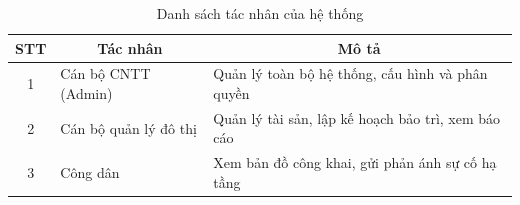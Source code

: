 \begin{table}[htbp]
    \centering
    \caption{Danh sách tác nhân của hệ thống}
    \label{tab:tac_nhan}
    \renewcommand{\arraystretch}{1.3} %
    \begin{tabular}{|c|p{4.5cm}|p{8.5cm}|}
        \hline
        \textbf{STT} & \multicolumn{1}{c|}{\textbf{Tác nhân}} & \multicolumn{1}{c|}{\textbf{Mô tả}} \\
        \hline
        1 & Cán bộ CNTT (Admin) & Quản lý toàn bộ hệ thống, cấu hình và phân quyền \\
        \hline
        2 & Cán bộ quản lý đô thị & Quản lý tài sản, lập kế hoạch bảo trì, xem báo cáo \\
        \hline
        3 & Công dân & Xem bản đồ công khai, gửi phản ánh sự cố hạ tầng \\
        \hline
    \end{tabular}
\end{table}